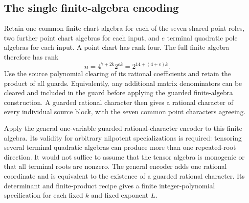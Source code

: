 \documentclass[11pt]{article}
\begin{document}
\subsection{The single finite-algebra encoding}

Retain one common finite chart algebra for each of the seven shared
point roles, two further point chart algebras for each input, and
$e$ terminal quadratic pole algebras for each input.  A point chart
has rank four.  The full finite algebra therefore has rank
\begin{equation}\label{eq:joint-few-rank}
                   n=4^{7+2k}2^{ek}
                     =2^{14+(4+e)k}.
\end{equation}
Use the source polynomial clearing of its rational coefficients
and retain the product of all guards.  Equivalently, any additional
matrix denominators can be cleared and included in the guard before
applying the guarded finite-algebra construction.  A guarded rational
character then gives a rational character of every individual source
block, with the seven common point characters agreeing.

Apply the general one-variable guarded rational-character encoder
to this finite algebra.  Its validity for arbitrary nilpotent
specializations is required: tensoring several terminal quadratic
algebras can produce more than one repeated-root direction.  It
would not suffice to assume that the tensor algebra is monogenic
or that all terminal roots are nonzero.  The general encoder adds
one rational coordinate and is equivalent to the existence of a
guarded rational character.  Its determinant and finite-product
recipe gives a finite integer-polynomial specification for each
fixed $k$ and fixed exponent $L$.
\end{document}
